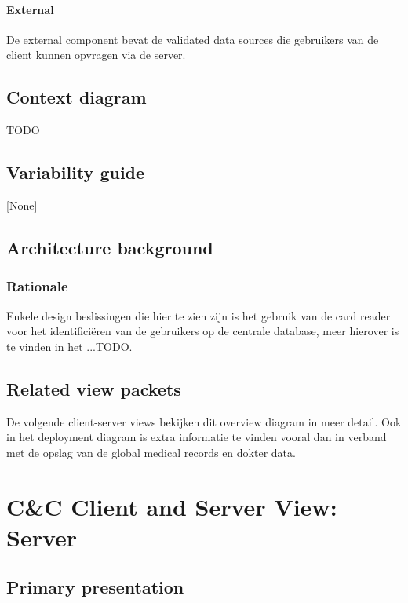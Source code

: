 \documentclass[a4paper,10pt]{paper}
\begin{document}
\paragraph{External}
De external component bevat de validated data sources die gebruikers van de client kunnen opvragen via de server.



\subsection{Context diagram}
TODO

\subsection{Variability guide}
[None]

\subsection{Architecture background}

\subsubsection{Rationale}
Enkele design beslissingen die hier te zien zijn is het gebruik van de card reader voor het identifici\"{e}ren van de gebruikers op de centrale database, meer hierover is te vinden in het ...TODO.

\subsection{Related view packets}
De volgende client-server views bekijken dit overview diagram in meer detail.  Ook in het deployment diagram is extra informatie te vinden vooral dan in verband met de opslag van de global medical records en dokter data.



\section{C\&C Client and Server View: Server}
\label{Client and Server View: Server}

\subsection{Primary presentation}
\end{document}
